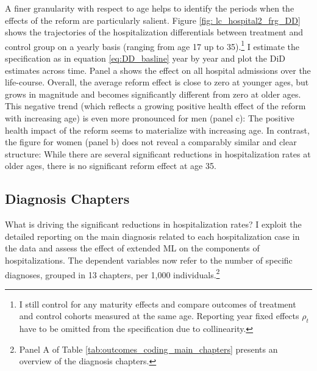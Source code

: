 \documentclass[11pt, a4paper, draft]{article} %
\begin{document}
A finer granularity with respect to age helps to identify the periods when the effects of the reform are particularly salient. Figure \ref{fig: lc_hospital2_frg_DD} shows the trajectories of the hospitalization differentials between treatment and control group on a yearly basis (ranging from age 17 up to 35).\footnote{I still control for any maturity effects and compare outcomes of treatment and control cohorts measured at the same age. Reporting year fixed effects $\rho_t$ have to be omitted from the specification due to collinearity.} I estimate the specification as in equation \ref{eq:DD_basline} year by year and plot the DiD estimates across time. Panel a shows the effect on all hospital admissions over the life-course. Overall, the average reform effect is close to zero at younger ages, but grows in magnitude and becomes significantly different from zero at older ages. This negative trend (which reflects a growing positive health effect of the reform with increasing age) is even more pronounced for men (panel c): The positive health impact of the reform seems to materialize with increasing age. In contrast, the figure for women (panel b) does not reveal a comparably similar and clear structure: While there are several significant reductions in hospitalization rates at older ages, there is no significant reform effect at age 35.



\bigskip
\subsection{Diagnosis Chapters}

What is driving the significant reductions in hospitalization rates? I exploit the detailed reporting on the main diagnosis related to each hospitalization case in the data and assess the effect of extended ML on the components of hospitalizations. The dependent variables now refer to the number of specific diagnoses, grouped in 13 chapters, per 1,000 individuals.\footnote{Panel A of Table \ref{tab:outcomes_coding_main_chapters} presents an overview of the diagnosis chapters.} 
\end{document}
